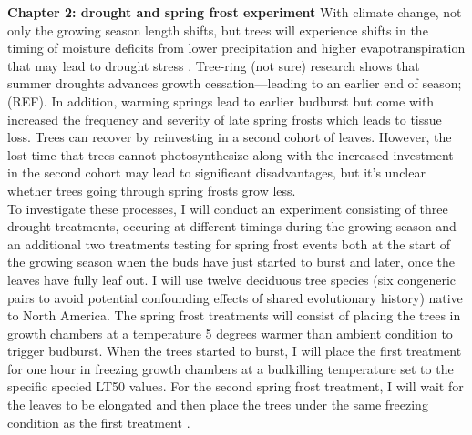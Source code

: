 \documentclass[12pt]{article}
\begin{document}
\textbf{Chapter 2: drought and spring frost experiment}
With climate change, not only the growing season length shifts, but trees will experience shifts in the timing of moisture deficits from lower precipitation and higher evapotranspiration that may lead to drought stress \cite{dox_wood_2022}. Tree-ring (not sure) research shows that summer droughts advances growth cessation---leading to an earlier end of season\citep{kang_earlier_2023}; (REF). In addition, warming springs lead to earlier budburst but come with increased the frequency and severity of late spring frosts which leads to tissue loss. Trees can recover by reinvesting in a second cohort of leaves. However, the lost time that trees cannot photosynthesize along with the increased investment in the second cohort may lead to significant disadvantages, but it's unclear whether trees going through spring frosts grow less. \\
To investigate these processes, I will conduct an experiment consisting of three drought treatments, occuring at different timings during the growing season and an additional two treatments testing for spring frost events both at the start of the growing season when the buds have just started to burst and later, once the leaves have fully leaf out. I will use twelve deciduous tree species (six congeneric pairs to avoid potential confounding effects of shared evolutionary history) native to North America. The spring frost treatments will consist of placing the trees in growth chambers at a temperature 5 degrees warmer than ambient condition to trigger budburst. When the trees started to burst, I will place the first treatment for one hour in freezing growth chambers at a budkilling temperature set to the specific specied LT50 values. For the second spring frost treatment, I will wait for the leaves to be elongated and then place the trees under the same freezing condition as the first treatment \citep{zohner_increased_2018}.\\
\end{document}
